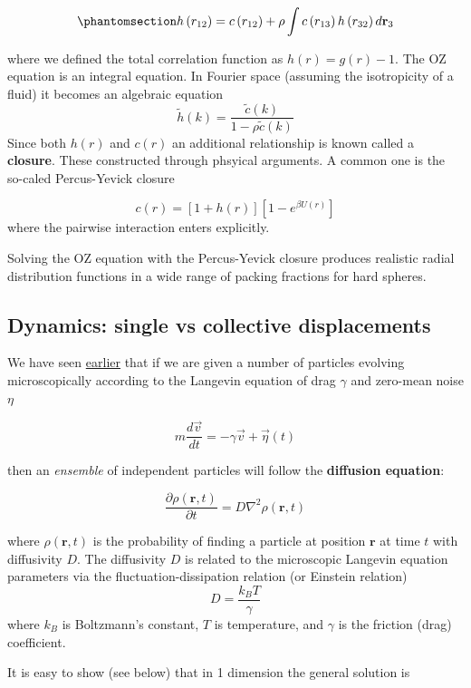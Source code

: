 \documentclass[
  letterpaper,
  enabledeprecatedfontcommands]{report}
\begin{document}
\begin{equation}\phantomsection\label{eq-oz}{
h\left(r_{12}\right)=c\left(r_{12}\right)+\rho \int c\left(r_{13}\right) h\left(r_{32}\right) d \mathbf{r}_3
}\end{equation}

where we defined the total correlation function as \(h(r)=g(r)-1\). The
OZ equation is an integral equation. In Fourier space (assuming the
isotropicity of a fluid) it becomes an algebraic equation \[
\tilde{h}(k)=\frac{\tilde{c}(k)}{1-\rho \tilde{c}(k)}
\] Since both \(h(r)\) and \(c(r)\) an additional relationship is known
called a \textbf{closure}. These constructed through phsyical arguments.
A common one is the so-caled Percus-Yevick closure

\[
c(r)=[1+h(r)]\left[1-e^{\beta U(r)}\right]
\] where the pairwise interaction enters explicitly.

Solving the OZ equation with the Percus-Yevick closure produces
realistic radial distribution functions in a wide range of packing
fractions for hard spheres.

\subsection{Dynamics: single vs collective
displacements}\label{dynamics-single-vs-collective-displacements}

We have seen
\href{../phase-transitions/Brownian-and-Langevin-dynamics.qmd}{earlier}
that if we are given a number of particles evolving microscopically
according to the Langevin equation of drag \(\gamma\) and zero-mean
noise \(\eta\)

\[
m \frac{d \vec{v}}{d t}=-\gamma\vec{v}+\vec{\eta}(t)
\]

then an \emph{ensemble} of independent particles will follow the
\textbf{diffusion equation}:

\[\frac{\partial \rho(\mathbf{r}, t)}{\partial t} = D \nabla^2 \rho(\mathbf{r}, t) \]

where \(\rho(\mathbf{r},t)\) is the probability of finding a particle at
position \(\mathbf{r}\) at time \(t\) with diffusivity \(D\). The
diffusivity \(D\) is related to the microscopic Langevin equation
parameters via the fluctuation-dissipation relation (or Einstein
relation) \[
D = \frac{k_B T}{\gamma}
\] where \(k_B\) is Boltzmann's constant, \(T\) is temperature, and
\(\gamma\) is the friction (drag) coefficient.

It is easy to show (see below) that in 1 dimension the general solution
is
\end{document}
